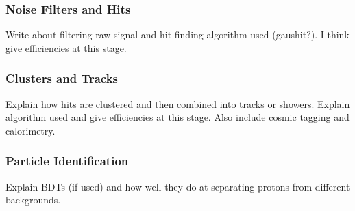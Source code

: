   \subsubsection{Noise Filters and Hits}
    Write about filtering raw signal and hit finding algorithm used (gaushit?). I think give efficiencies at this stage.
  \subsubsection{Clusters and Tracks}
    Explain how hits are clustered and then combined into tracks or showers. Explain algorithm used and give efficiencies at this stage. Also include cosmic tagging and calorimetry.
  \subsubsection{Particle Identification}
    Explain BDTs (if used) and how well they do at separating protons from different backgrounds.

